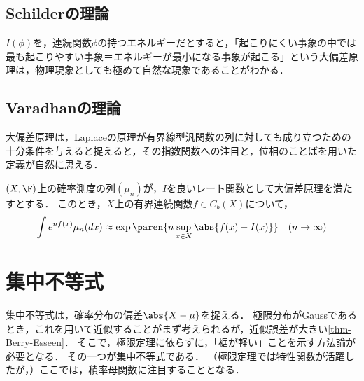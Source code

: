 \documentclass[uplatex,dvipdfmx]{jsreport}
\begin{document}
\subsection{Schilderの理論}

\begin{tcolorbox}[colframe=ForestGreen, colback=ForestGreen!10!white,breakable,colbacktitle=ForestGreen!40!white,coltitle=black,fonttitle=\bfseries\sffamily,
title=確率過程に関する大偏差原理]
    $I(\phi)$を，連続関数$\phi$の持つエネルギーだとすると，「起こりにくい事象の中では最も起こりやすい事象＝エネルギーが最小になる事象が起こる」という大偏差原理は，物理現象としても極めて自然な現象であることがわかる．
\end{tcolorbox}

\subsection{Varadhanの理論}

\begin{tcolorbox}[colframe=ForestGreen, colback=ForestGreen!10!white,breakable,colbacktitle=ForestGreen!40!white,coltitle=black,fonttitle=\bfseries\sffamily,
title=]
    大偏差原理は，Laplaceの原理が有界線型汎関数の列に対しても成り立つための十分条件を与えると捉えると，その指数関数への注目と，位相のことばを用いた定義が自然に思える．
\end{tcolorbox}

\begin{lemma}
    $(X,\F)$上の確率測度の列$(\mu_n)$が，$I$を良いレート関数として大偏差原理を満たすとする．
    このとき，$X$上の有界連続関数$f\in C_b(X)$について，
    \[\int e^{nf(x)}\mu_n(dx)\approx\exp\paren{n\sup_{x\in X}\abs{f(x)-I(x)}}\quad(n\to\infty)\]
\end{lemma}

\section{集中不等式}

\begin{tcolorbox}[colframe=ForestGreen, colback=ForestGreen!10!white,breakable,colbacktitle=ForestGreen!40!white,coltitle=black,fonttitle=\bfseries\sffamily,
    title=]
    集中不等式は，確率分布の偏差$\abs{X-\mu}$を捉える．
    極限分布がGaussであるとき，これを用いて近似することがまず考えられるが，近似誤差が大きい\ref{thm-Berry-Esseen}．
    そこで，極限定理に依らずに，「裾が軽い」ことを示す方法論が必要となる．
    その一つが集中不等式である．
    （極限定理では特性関数が活躍したが，）ここでは，積率母関数に注目することとなる．
\end{tcolorbox}
\end{document}
